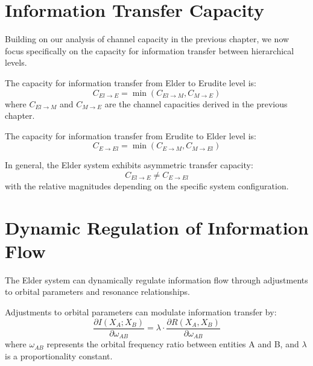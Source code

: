 \section{Information Transfer Capacity}

Building on our analysis of channel capacity in the previous chapter, we now focus specifically on the capacity for information transfer between hierarchical levels.

\begin{theorem}
The capacity for information transfer from Elder to Erudite level is:
\begin{equation}
C_{El \to E} = \min\left(C_{El \to M}, C_{M \to E}\right)
\end{equation}
where $C_{El \to M}$ and $C_{M \to E}$ are the channel capacities derived in the previous chapter.
\end{theorem}

\begin{theorem}
The capacity for information transfer from Erudite to Elder level is:
\begin{equation}
C_{E \to El} = \min\left(C_{E \to M}, C_{M \to El}\right)
\end{equation}
\end{theorem}

\begin{theorem}
In general, the Elder system exhibits asymmetric transfer capacity:
\begin{equation}
C_{El \to E} \neq C_{E \to El}
\end{equation}
with the relative magnitudes depending on the specific system configuration.
\end{theorem}

\section{Dynamic Regulation of Information Flow}

The Elder system can dynamically regulate information flow through adjustments to orbital parameters and resonance relationships.

\begin{theorem}
Adjustments to orbital parameters can modulate information transfer by:
\begin{equation}
\frac{\partial I(X_A; X_B)}{\partial \omega_{AB}} = \lambda \cdot \frac{\partial R(X_A, X_B)}{\partial \omega_{AB}}
\end{equation}
where $\omega_{AB}$ represents the orbital frequency ratio between entities A and B, and $\lambda$ is a proportionality constant.
\end{theorem}

